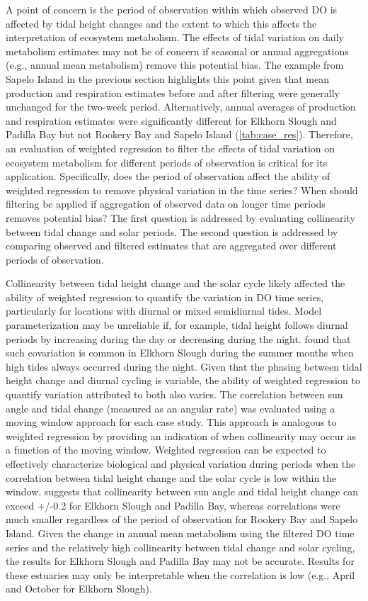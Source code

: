 \documentclass[letterpaper,12pt,oneside]{article}\usepackage[]{graphicx}\usepackage[]{color}
\begin{document}
A point of concern is the period of observation within which observed \ac{DO} is affected by tidal height changes and the extent to which this affects the interpretation of ecosystem metabolism.  The effects of tidal variation on daily metabolism estimates may not be of concern if seasonal or annual aggregations (e.g., annual mean metabolism) remove this potential bias.  The example from Sapelo Island in the previous section highlights this point given that mean production and respiration estimates before and after filtering were generally unchanged for the two-week period. Alternatively, annual averages of production and respiration estimates were significantly different for Elkhorn Slough and Padilla Bay but not Rookery Bay and Sapelo Island (\cref{tab:case_res}).  Therefore, an evaluation of weighted regression to filter the effects of tidal variation on ecosystem metabolism for different periods of observation is critical for its application.  Specifically, does the period of observation affect the ability of weighted regression to remove physical variation in the time series?  When should filtering be applied if aggregation of observed data on longer time periods removes potential bias?  The first question is addressed by evaluating collinearity between tidal change and solar periods.  The second question is addressed by comparing observed and filtered estimates that are aggregated over different periods of observation.

Collinearity between tidal height change and the solar cycle likely affected the ability of weighted regression to quantify the variation in \ac{DO} time series, particularly for locations with diurnal or mixed semidiurnal tides.  Model parameterization may be unreliable if, for example, tidal height follows diurnal periods by increasing during the day or decreasing during the night.  \citet{Nidzieko14} found that such covariation is common in Elkhorn Slough during the summer months when high tides always occurred during the night.  Given that the phasing between tidal height change and diurnal cycling is variable, the ability of weighted regression to quantify variation attributed to both also varies.   The correlation between sun angle and tidal change (measured as an angular rate) was evaluated using a moving window approach for each case study.  This approach is analogous to weighted regression by providing an indication of when collinearity may occur as a function of the moving window.  Weighted regression can be expected to effectively characterize biological and physical variation during periods when the correlation between tidal height change and the solar cycle is low within the window.   suggests that collinearity between sun angle and tidal height change can exceed +/-0.2 for Elkhorn Slough and Padilla Bay, whereas correlations were much smaller regardless of the period of observation for Rookery Bay and Sapelo Island.  Given the change in annual mean metabolism using the filtered \ac{DO} time series and the relatively high collinearity between tidal change and solar cycling, the results for Elkhorn Slough and Padilla Bay may not be accurate.  Results for these estuaries may only be interpretable when the correlation is low (e.g., April and October for Elkhorn Slough). 
\end{document}
